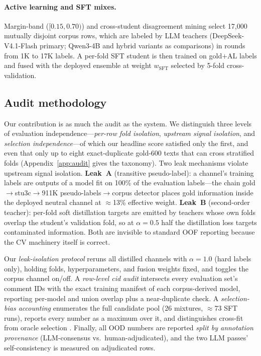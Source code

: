 \paragraph{Active learning and SFT mixes.} Margin-band
($[0.15,0.70)$) and cross-student disagreement mining select 17{,}000
mutually disjoint corpus rows, which are labeled by LLM teachers
(DeepSeek-V4.1-Flash primary; Qwen3-4B and hybrid variants as comparisons)
in rounds from 1K to 17K labels. A per-fold SFT student is then trained on
gold$+$AL labels and fused with the deployed ensemble at weight $w_{\mathrm{SFT}}$
selected by 5-fold cross-validation.

\subsection{Audit methodology}
\label{sec:audit}

Our contribution is as much the audit as the system. We distinguish
three levels of evaluation independence---\emph{per-row fold
isolation}, \emph{upstream signal isolation}, and \emph{selection
independence}---of which our headline score satisfied only the first,
and even that only up to eight exact-duplicate gold-600 texts that can
cross stratified folds (Appendix~\ref{app:audit} gives the taxonomy).
Two leak
mechanisms violate upstream signal isolation. \textbf{Leak~A}
(transitive pseudo-label): a channel's training labels are outputs of
a model fit on 100\% of the evaluation labels---the chain
gold$\to$stu3c$\to$911K pseudo-labels$\to$corpus detector places gold
information inside the deployed neutral channel at $\approx$13\%
effective weight. \textbf{Leak~B} (second-order teacher): per-fold
soft distillation targets are emitted by teachers whose own folds
overlap the student's validation fold, so at $\alpha{=}0.5$ half the
distillation loss targets contaminated information. Both are invisible
to standard OOF reporting because the CV machinery itself is correct.

Our \emph{leak-isolation protocol} reruns all distilled channels with
$\alpha{=}1.0$ (hard labels only), holding folds, hyperparameters, and
fusion weights fixed, and toggles the corpus channel on/off. A
\emph{row-level cid audit} intersects every evaluation set's comment
IDs with the exact training manifest of each corpus-derived model,
reporting per-model and union overlap plus a near-duplicate check.
A \emph{selection-bias accounting} enumerates the full candidate pool
(26 mixtures, $\approx$73 SFT runs), reports every number as a maximum
over it, and distinguishes cross-fit from oracle selection
\citep{dror2018hitchhiker}. Finally,
all OOD numbers are reported \emph{split by annotation provenance}
(LLM-consensus vs.\ human-adjudicated), and the two LLM passes'
self-consistency is measured on adjudicated rows.

